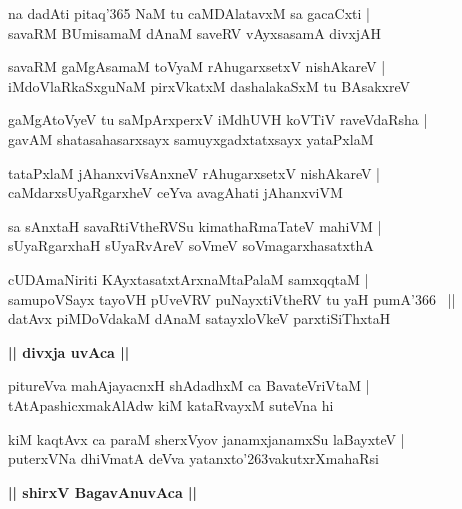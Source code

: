 \documentclass[twoside,12pt,openright]{book}
\def\S{\char'263}
\newcounter{shloka}[chapter]
\def\uvaca#1{\centerline{{\large\textbf{#1}}}}
\begin{document}
\begin{shloka}%
na dadAti pitaq\char'365 NaM tu caMDAlatavxM sa gacaCxti |\\
savaRM BUmisamaM dAnaM saveRV vAyxsasamA divxjAH 
\end{shloka}

\begin{shloka}%
savaRM gaMgAsamaM toVyaM rAhugarxsetxV nishAkareV |\\
iMdoVlaRkaSxguNaM pirxVkatxM dashalakaSxM tu BAsakxreV 
\end{shloka}

\begin{shloka}%
gaMgAtoVyeV tu saMpArxperxV iMdhUVH koVTiV raveVdaRsha |\\
gavAM shatasahasarxsayx samuyxgadxtatxsayx yataPxlaM 
\end{shloka}

\begin{shloka}%
tataPxlaM jAhanxviVsAnxneV rAhugarxsetxV nishAkareV |\\
caMdarxsUyaRgarxheV ceYva avagAhati jAhanxviVM 
\end{shloka}

\begin{shloka}%
sa sAnxtaH savaRtiVtheRVSu kimathaRmaTateV mahiVM |\\
sUyaRgarxhaH sUyaRvAreV soVmeV soVmagarxhasatxthA 
\end{shloka}

\begin{shloka}%
cUDAmaNiriti KAyxtasatxtArxnaMtaPalaM samxqqtaM |\\
samupoVSayx tayoVH pUveVRV puNayxtiVtheRV tu yaH pumA\char'366 ~||\\
datAvx piMDoVdakaM dAnaM satayxloVkeV parxtiSiThxtaH 
\end{shloka}

\uvaca{|| divxja uvAca ||}

\begin{shloka}%
pitureVva mahAjayacnxH shAdadhxM ca BavateVriVtaM |\\
tAtApashicxmakAlAdw kiM kataRvayxM suteVna hi
\end{shloka}

\begin{shloka}%
kiM kaqtAvx ca paraM sherxVyov janamxjanamxSu laBayxteV |\\
puterxVNa dhiVmatA deVva yatanxto\S vakutxrXmahaRsi
\end{shloka}

\uvaca{|| shirxV BagavAnuvAca ||}
\end{document}
